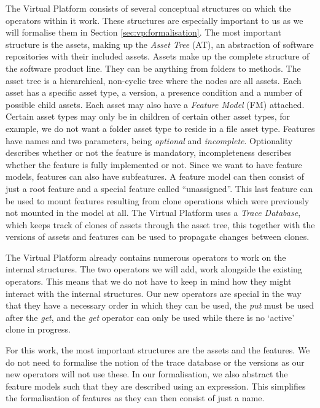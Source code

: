 The Virtual Platform consists of several conceptual structures on which the
operators within it work. These structures are especially important to us as we
will formalise them in Section \ref{sec:vp:formalisation}. The most important
structure is the assets, making up the \emph{Asset Tree} (AT), an abstraction
of software repositories with their included assets. Assets make up
the complete structure of the software product line. They can be anything from
folders to methods. The asset tree is a hierarchical, non-cyclic tree where the 
nodes are all assets. Each asset has a specific asset type, a version, a presence
condition and a number of possible child assets. Each asset may also have a
\emph{Feature Model} (FM) attached. 
Certain asset types may only be in children of certain other asset types, for
example, we do not want a folder asset type to reside in a file asset type.
Features have names and two parameters, being \emph{optional} and
\emph{incomplete}. Optionality describes whether or not the feature is
mandatory, incompleteness describes whether the feature is fully implemented or
not. Since we want to have feature models, features can also have subfeatures. 
A feature model can then consist of just a root feature and a special
feature called ``unassigned''. This last feature can be used to mount features
resulting from clone operations which were previously not mounted in the model
at all. The Virtual Platform uses a \emph{Trace Database}, which keeps track of
clones of assets through the asset tree, this together with the versions of assets
and features can be used to propagate changes between clones.

The Virtual Platform already contains numerous operators to work on the internal
structures. The two operators we will add, work alongside the existing operators.
This means that we do not have to keep in mind how they might interact with the
internal structures. Our new operators are special in the way that they have a
necessary order in which they can be used, the \emph{put} must be used after the
\emph{get}, and the \emph{get} operator can only be used while there is no `active'
clone in progress.

For this work, the most important structures are the assets and the features.
We do not need to formalise the notion of the trace database or the versions as
our new operators will not use these. In our formalisation, we also abstract the
feature models such that they are described using an expression. This
simplifies the formalisation of features as they can then consist of just a
name.

